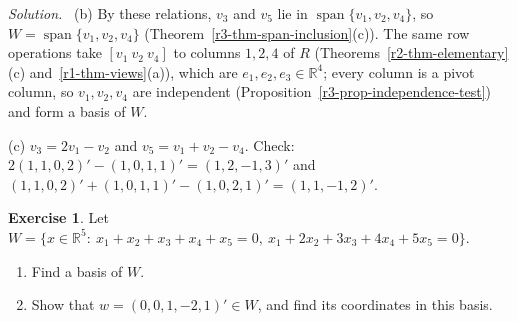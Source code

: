 \documentclass[12pt]{article}
\newcommand{\R}{\mathbb R}
\DeclareMathOperator{\Span}{span}
\theoremstyle{definition}
\newtheorem{exercise}{Exercise}
\newenvironment{solution}{\par\noindent\textit{Solution.}\ }{\par\smallskip}
\begin{document}
\begin{solution}
(b) By these relations, \(v_3\) and \(v_5\) lie in \(\Span\{v_1,v_2,v_4\}\), so
\(W=\Span\{v_1,v_2,v_4\}\) (Theorem~\ref{r3-thm-span-inclusion}(c)). The same row operations take
\([v_1\ v_2\ v_4]\) to columns \(1,2,4\) of \(R\) (Theorems~\ref{r2-thm-elementary}(c)
and~\ref{r1-thm-views}(a)), which are \(e_1,e_2,e_3\in\R^4\); every column is a pivot column, so
\(v_1,v_2,v_4\) are independent (Proposition~\ref{r3-prop-independence-test}) and form a basis of \(W\).

(c) \(v_3=2v_1-v_2\) and \(v_5=v_1+v_2-v_4\). Check: \(2(1,1,0,2)'-(1,0,1,1)'=(1,2,-1,3)'\) and
\((1,1,0,2)'+(1,0,1,1)'-(1,0,2,1)'=(1,1,-1,2)'\).
\end{solution}

\begin{exercise}\label{r3-ex-basis-equations}
Let \(W=\{x\in\R^5:\ x_1+x_2+x_3+x_4+x_5=0,\ x_1+2x_2+3x_3+4x_4+5x_5=0\}\).
\begin{enumerate}
\item Find a basis of \(W\).
\item Show that \(w=(0,0,1,-2,1)'\in W\), and find its coordinates in this basis.
\end{enumerate}
\end{exercise}
\end{document}
